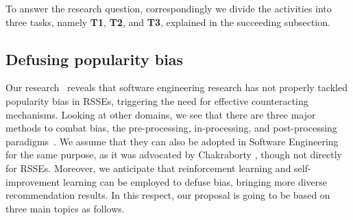 To answer the research question, correspondingly we divide the activities into three tasks, namely \textbf{T1}, \textbf{T2}, and \textbf{T3}, %
explained in the succeeding subsection.






\subsection{Defusing popularity bias}


Our research~\cite{10174041} reveals that software engineering research has not properly tackled popularity bias in RSSEs, triggering the need for effective counteracting mechanisms. 
Looking at other domains, we see that there are three major methods to combat bias, \ie the pre-processing, in-processing, and post-processing paradigms~\cite{doi:10.1089/big.2016.0048}. We assume that they can also be adopted in Software Engineering for the same purpose, as it was advocated by Chakraborty \etal \cite{ChakrabortyM0M20}, though not directly for RSSEs. Moreover, we anticipate that reinforcement learning and self-improvement learning can be employed to defuse bias, bringing more diverse recommendation results. In this respect, our proposal is going to be based on three main topics as follows.


